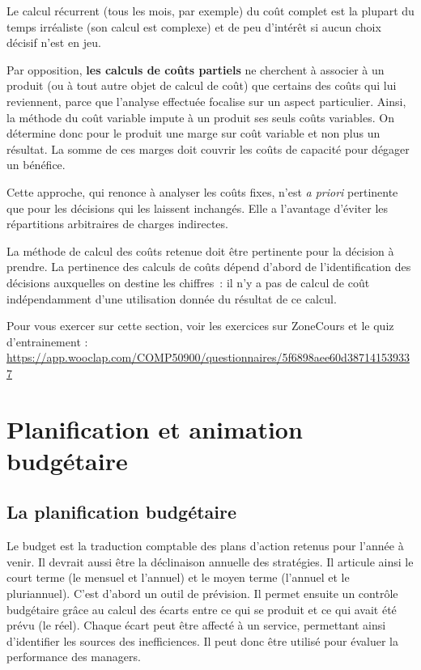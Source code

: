 \documentclass[oneside]{kaobook}
\begin{document}
Le calcul récurrent (tous les mois, par exemple) du coût complet est la plupart du temps irréaliste (son calcul est complexe) et de peu d'intérêt si aucun choix décisif n'est en jeu.

Par opposition, \textbf{les calculs de coûts partiels} ne cherchent à associer à un produit (ou à tout autre objet de calcul de coût) que certains des coûts qui lui reviennent, parce que l'analyse effectuée focalise sur un aspect particulier. Ainsi, la méthode du coût variable impute à un produit ses seuls coûts variables. On détermine donc pour le produit une marge sur coût variable et non plus un résultat. La somme de ces marges doit couvrir les coûts de capacité pour dégager un bénéfice.

Cette approche, qui renonce à analyser les coûts fixes, n'est \emph{a priori} pertinente que pour les décisions qui les laissent inchangés. Elle a l'avantage d'éviter les répartitions arbitraires de charges indirectes.

\begin{kaowarn}
La méthode de calcul des coûts retenue doit être pertinente pour la décision à prendre. La pertinence des calculs de coûts dépend d'abord de l'identification des décisions auxquelles on destine les chiffres : il n'y a pas de calcul de coût indépendamment d'une utilisation donnée du résultat de ce calcul.
\end{kaowarn}

\begin{kaobox}
Pour vous exercer sur cette section, voir les exercices sur ZoneCours et le quiz d'entrainement : \url{https://app.wooclap.com/COMP50900/questionnaires/5f6898aee60d387141539337}
\end{kaobox}

\chapter{Planification et animation budgétaire}
\label{sec:org9d41c52}
\section{La planification budgétaire}
\label{sec:org7e91b7d}
Le budget est la traduction comptable des plans d'action retenus pour l'année à venir. Il devrait aussi être la déclinaison annuelle des stratégies. Il articule ainsi le court terme (le mensuel et l'annuel) et le moyen terme (l'annuel et le pluriannuel). C'est d'abord un outil de prévision. 
Il permet ensuite un contrôle budgétaire grâce au calcul des écarts entre ce qui se produit et ce qui avait été prévu (le réel). Chaque écart peut être affecté à un service, permettant ainsi d'identifier les sources des inefficiences. Il peut donc être utilisé pour évaluer la performance des managers. 
\end{document}
